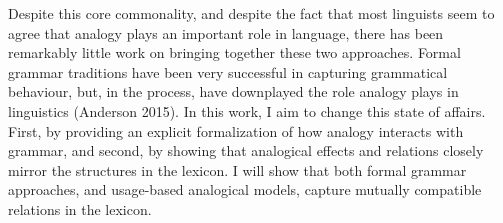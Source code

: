 {Despite this core commonality, and despite the fact that most linguists seem to agree that analogy plays an important role in language, there has been remarkably little work on bringing together these two approaches. Formal grammar traditions have been very successful in capturing grammatical behaviour, but, in the process, have downplayed the role analogy plays in linguistics (Anderson 2015). In this work, I aim to change this state of affairs. First, by providing an explicit formalization of how analogy interacts with grammar, and second, by showing that analogical effects and relations closely mirror the structures in the lexicon. I
will show that both formal grammar approaches, and usage-based analogical models, capture mutually compatible relations in the lexicon.
}


\renewcommand{\lsID}{186} %
\renewcommand{\lsISBNdigital}{978-3-96110-186-3}
\renewcommand{\lsISBNhardcover}{978-3-96110-187-0} 
